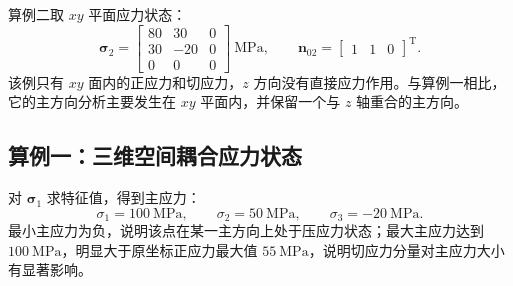 \documentclass[UTF8,a4paper,12pt]{ctexart}
\newcommand{\stress}{\bm{\sigma}}
\newcommand{\vect}[1]{\bm{#1}}
\begin{document}
算例二取 $xy$ 平面应力状态：
\begin{equation}
\stress_2 =
\begin{bmatrix}
80 & 30 & 0 \\
30 & -20 & 0 \\
0 & 0 & 0
\end{bmatrix}\ \mathrm{MPa},\qquad
\vect n_{02}=\begin{bmatrix}1 & 1 & 0\end{bmatrix}^{\mathrm T}.
\end{equation}
该例只有 $xy$ 面内的正应力和切应力，$z$ 方向没有直接应力作用。与算例一相比，它的主方向分析主要发生在 $xy$ 平面内，并保留一个与 $z$ 轴重合的主方向。

\subsection{算例一：三维空间耦合应力状态}

对 $\stress_1$ 求特征值，得到主应力：
\begin{equation}
\sigma_1=100\ \mathrm{MPa},\qquad
\sigma_2=50\ \mathrm{MPa},\qquad
\sigma_3=-20\ \mathrm{MPa}.
\end{equation}
最小主应力为负，说明该点在某一主方向上处于压应力状态；最大主应力达到 $100\ \mathrm{MPa}$，明显大于原坐标正应力最大值 $55\ \mathrm{MPa}$，说明切应力分量对主应力大小有显著影响。
\end{document}
